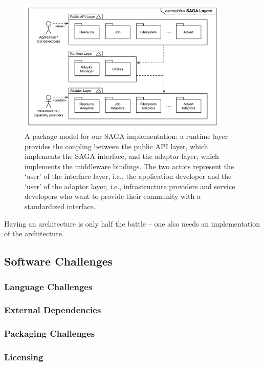 \documentclass[a4paper,12pt]{article}
\begin{document}
\begin{figure}[h!] \centering
\includegraphics[width=0.9\textwidth]{figures/package_model.pdf} 
\caption{A package model for our SAGA implementation: a runtime layer provides the
coupling between the public API layer, which implements the SAGA interface, and
the adaptor layer, which implements the middleware bindings. The two actors represent 
the `user' of the interface layer, i.e., the application developer and the `user'
of the adaptor layer, i.e., infrastructure providers and service developers who
want to provide their community with a standardized interface.} 
\end{figure}


Having an architecture is only half the battle -- one also needs an
implementation of the architecture.


\subsection{Software Challenges}


\subsubsection{Language Challenges}

\subsubsection{External Dependencies}

\subsubsection{Packaging Challenges}

\subsubsection{Licensing}
\end{document}

